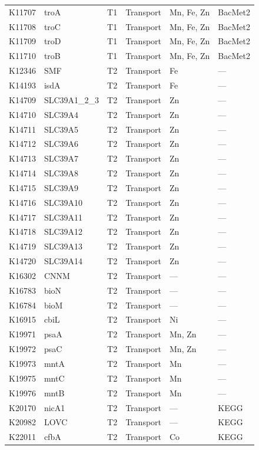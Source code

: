 \documentclass[11pt]{article}
\begin{document}
\begin{longtable}{@{}llllp{3.8cm}l@{}}
K11707 & troA & T1 & Transport & Mn, Fe, Zn & BacMet2 \\
K11708 & troC & T1 & Transport & Mn, Fe, Zn & BacMet2 \\
K11709 & troD & T1 & Transport & Mn, Fe, Zn & BacMet2 \\
K11710 & troB & T1 & Transport & Mn, Fe, Zn & BacMet2 \\
K12346 & SMF & T2 & Transport & Fe & --- \\
K14193 & isdA & T2 & Transport & Fe & --- \\
K14709 & SLC39A1\_2\_3 & T2 & Transport & Zn & --- \\
K14710 & SLC39A4 & T2 & Transport & Zn & --- \\
K14711 & SLC39A5 & T2 & Transport & Zn & --- \\
K14712 & SLC39A6 & T2 & Transport & Zn & --- \\
K14713 & SLC39A7 & T2 & Transport & Zn & --- \\
K14714 & SLC39A8 & T2 & Transport & Zn & --- \\
K14715 & SLC39A9 & T2 & Transport & Zn & --- \\
K14716 & SLC39A10 & T2 & Transport & Zn & --- \\
K14717 & SLC39A11 & T2 & Transport & Zn & --- \\
K14718 & SLC39A12 & T2 & Transport & Zn & --- \\
K14719 & SLC39A13 & T2 & Transport & Zn & --- \\
K14720 & SLC39A14 & T2 & Transport & Zn & --- \\
K16302 & CNNM & T2 & Transport & --- & --- \\
K16783 & bioN & T2 & Transport & --- & --- \\
K16784 & bioM & T2 & Transport & --- & --- \\
K16915 & cbiL & T2 & Transport & Ni & --- \\
K19971 & psaA & T2 & Transport & Mn, Zn & --- \\
K19972 & psaC & T2 & Transport & Mn, Zn & --- \\
K19973 & mntA & T2 & Transport & Mn & --- \\
K19975 & mntC & T2 & Transport & Mn & --- \\
K19976 & mntB & T2 & Transport & Mn & --- \\
K20170 & nicA1 & T2 & Transport & --- & KEGG \\
K20982 & LOVC & T2 & Transport & --- & KEGG \\
K22011 & cfbA & T2 & Transport & Co & KEGG \\

\end{longtable}
\end{document}
